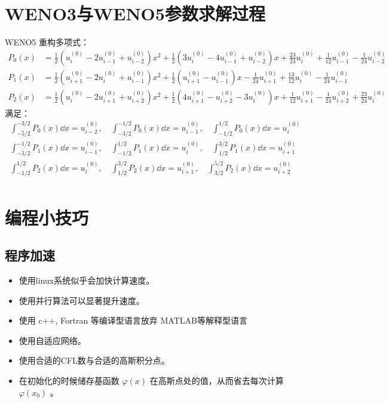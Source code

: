 \documentclass{book}
\begin{document}
\section{WENO3与WENO5参数求解过程}
WENO5 重构多项式：
\begin{equation}
  \begin{aligned}
    P_0(x) & = \frac{1}{2} \left(u_{i}^{(0)} - 2 u_{i-1}^{(0)} + u_{i-2}^{(0)}\right)x^2 + \frac{1}{2} \left(3  u_{i}^{(0)} - 4 u_{i-1}^{(0)} + u_{i-2}^{(0)}\right)  x + \frac{23}{24}u_{i}^{(0)} +\frac{1}{12} u_{i-1}^{(0)} -\frac{1}{24} u_{i-2}^{(0)}        \\
    P_1(x) & = \frac{1}{2} \left(u_{i+1}^{(0)} - 2  u_{i}^{(0)} + u_{i-1}^{(0)}\right)x^2 + \frac{1}{2}  \left(u_{i+1}^{(0)} - u_{i-1}^{(0)}\right)  x -\frac{1}{24}  u_{i+1}^{(0)} + \frac{13}{12}  u_{i}^{(0)} -\frac{1}{24}  u_{i-1}^{(0)}                     \\
    P_2(x) & = \frac{1}{2}  \left(u_{i}^{(0)} - 2  u_{i+1}^{(0)} + u_{i+2}^{(0)}\right)x^2 + \frac{1}{2}\left(4  u_{i+1}^{(0)} - u_{i+2}^{(0)} - 3  u_{i}^{(0)}\right)  x + \frac{1}{12}  u_{i+1}^{(0)} -\frac{1}{24}  u_{i+2}^{(0)} + \frac{23}{24}  u_{i}^{(0)}
  \end{aligned}
\end{equation}
满足：
\begin{equation}
  \begin{aligned}
    \int_{-5/2}^{-3/2} P_0(x)\dd x = u_{i-2}^{(0)},\quad \int_{-3/2}^{-1/2} P_0(x)\dd x = u_{i-1}^{(0)},\quad \int_{-1/2}^{1/2} P_0(x)\dd x = u_{i}^{(0)} \\
    \int_{-3/2}^{-1/2} P_1(x)\dd x = u_{i-1}^{(0)},\quad \int_{-1/2}^{1/2} P_1(x)\dd x = u_{i}^{(0)},\quad \int_{1/2}^{3/2} P_1(x)\dd x = u_{i+1}^{(0)}   \\
    \int_{-1/2}^{1/2} P_2(x)\dd x = u_{i}^{(0)},\quad \int_{1/2}^{3/2} P_2(x)\dd x = u_{i+1}^{(0)},\quad \int_{3/2}^{5/2} P_2(x)\dd x = u_{i+2}^{(0)}     \\
  \end{aligned}
\end{equation}






\section{编程小技巧}
\subsection{程序加速}
\begin{itemize}
  \item 使用linux系统似乎会加快计算速度。
  \item 使用并行算法可以显著提升速度。
  \item 使用 c++, Fortran 等编译型语言放弃 MATLAB等解释型语言
  \item 使用自适应网络。
  \item 使用合适的CFL数与合适的高斯积分点。
  \item 在初始化的时候储存基函数 $\varphi(x)$ 在高斯点处的值，从而省去每次计算 $\varphi(x_0)$ 。
\end{itemize}
\end{document}
